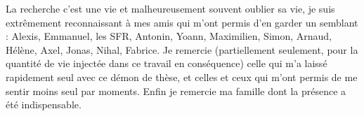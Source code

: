 La recherche c'est une vie et malheureusement souvent oublier sa vie, je suis extrêmement reconnaissant à mes amis qui m'ont permis d'en garder un semblant : Alexis, Emmanuel, les SFR, Antonin, Yoann, Maximilien, Simon, Arnaud, Hélène, Axel, Jonas, Nihal, Fabrice. Je remercie (partiellement seulement, pour la quantité de vie injectée dans ce travail en conséquence) celle qui m'a laissé rapidement seul avec ce démon de thèse, et celles et ceux qui m'ont permis de me sentir moins seul par moments. Enfin je remercie ma famille dont la présence a été indispensable.


\stars

































\endgroup